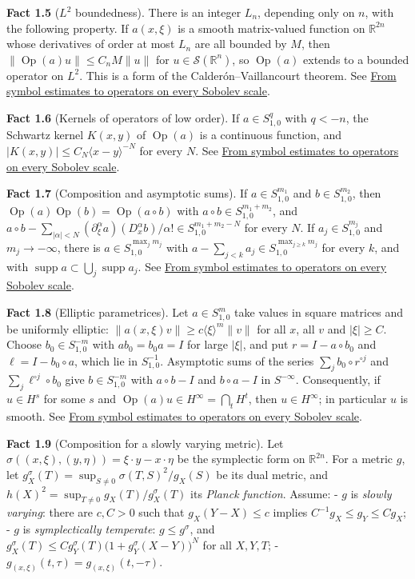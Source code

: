 \documentclass[
  11pt,
]{article}
\begin{document}
\textbf{Fact 1.5} (\(L^2\) boundedness). There is an integer \(L_n\),
depending only on \(n\), with the following property. If \(a(x,\xi)\) is
a smooth matrix-valued function on \(\mathbb R^{2n}\) whose derivatives
of order at most \(L_n\) are all bounded by \(M\), then
\(\|\operatorname{Op}(a)u\|\le C_nM\|u\|\) for
\(u\in\mathcal S(\mathbb R^n)\), so \(\operatorname{Op}(a)\) extends to
a bounded operator on \(L^2\). This is a form of the
Calderón--Vaillancourt theorem. See
\href{euclidean-symbol-calculus.pdf}{From symbol estimates to operators
on every Sobolev scale}.

\textbf{Fact 1.6} (Kernels of operators of low order). If
\(a\in S^q_{1,0}\) with \(q<-n\), the Schwartz kernel \(K(x,y)\) of
\(\operatorname{Op}(a)\) is a continuous function, and
\(|K(x,y)|\le C_N\langle x-y\rangle^{-N}\) for every \(N\). See
\href{euclidean-symbol-calculus.pdf}{From symbol estimates to operators
on every Sobolev scale}.

\textbf{Fact 1.7} (Composition and asymptotic sums). If
\(a\in S^{m_1}_{1,0}\) and \(b\in S^{m_2}_{1,0}\), then
\(\operatorname{Op}(a)\operatorname{Op}(b)=\operatorname{Op}(a\circ b)\)
with \(a\circ b\in S^{m_1+m_2}_{1,0}\), and
\(a\circ b-\sum_{|\alpha|<N}(\partial_\xi^\alpha a)(D_x^\alpha b)/\alpha!\in S^{m_1+m_2-N}_{1,0}\)
for every \(N\). If \(a_j\in S^{m_j}_{1,0}\) and \(m_j\to-\infty\),
there is \(a\in S^{\max_jm_j}_{1,0}\) with
\(a-\sum_{j<k}a_j\in S^{\max_{j\ge k}m_j}_{1,0}\) for every \(k\), and
with \(\operatorname{supp}a\subset\bigcup_j\operatorname{supp}a_j\). See
\href{euclidean-symbol-calculus.pdf}{From symbol estimates to operators
on every Sobolev scale}.

\textbf{Fact 1.8} (Elliptic parametrices). Let \(a\in S^m_{1,0}\) take
values in square matrices and be uniformly elliptic:
\(\|a(x,\xi)v\|\ge c\langle\xi\rangle^m\|v\|\) for all \(x\), all \(v\)
and \(|\xi|\ge C\). Choose \(b_0\in S^{-m}_{1,0}\) with \(ab_0=b_0a=I\)
for large \(|\xi|\), and put \(r=I-a\circ b_0\) and
\(\ell=I-b_0\circ a\), which lie in \(S^{-1}_{1,0}\). Asymptotic sums of
the series \(\sum_jb_0\circ r^{\circ j}\) and
\(\sum_j\ell^{\circ j}\circ b_0\) give \(b\in S^{-m}_{1,0}\) with
\(a\circ b-I\) and \(b\circ a-I\) in \(S^{-\infty}\). Consequently, if
\(u\in H^s\) for some \(s\) and
\(\operatorname{Op}(a)u\in H^\infty=\bigcap_tH^t\), then
\(u\in H^\infty\); in particular \(u\) is smooth. See
\href{euclidean-symbol-calculus.pdf}{From symbol estimates to operators
on every Sobolev scale}.

\textbf{Fact 1.9} (Composition for a slowly varying metric). Let
\(\sigma((x,\xi),(y,\eta))=\xi\cdot y-x\cdot\eta\) be the symplectic
form on \(\mathbb R^{2n}\). For a metric \(g\), let
\(g^\sigma_X(T)=\sup_{S\ne0}\sigma(T,S)^2/g_X(S)\) be its dual metric,
and \(h(X)^2=\sup_{T\ne0}g_X(T)/g^\sigma_X(T)\) its \emph{Planck
function}. Assume: - \(g\) is \emph{slowly varying}: there are \(c,C>0\)
such that \(g_X(Y-X)\le c\) implies \(C^{-1}g_X\le g_Y\le Cg_X\); -
\(g\) is \emph{symplectically temperate}: \(g\le g^\sigma\), and
\(g^\sigma_X(T)\le Cg^\sigma_Y(T)\bigl(1+g^\sigma_Y(X-Y)\bigr)^N\) for
all \(X,Y,T\); - \(g_{(x,\xi)}(t,\tau)=g_{(x,\xi)}(t,-\tau)\).
\end{document}
